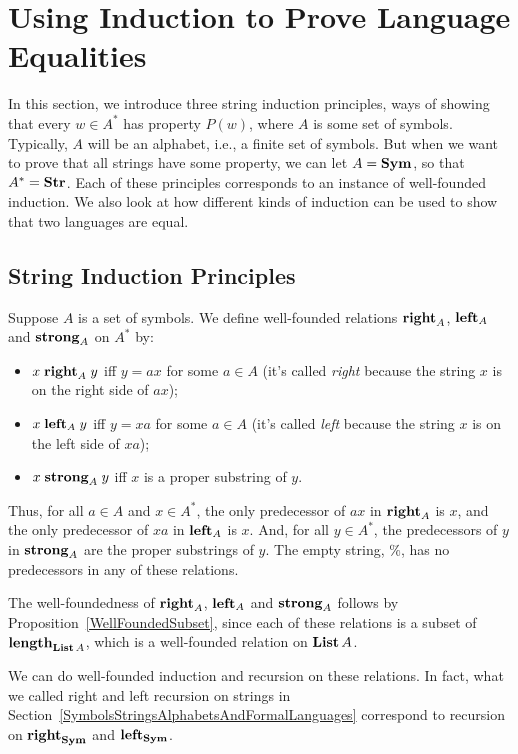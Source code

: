 \section{Using Induction to Prove Language Equalities}
\label{UsingInductionToProveLanguageEqualities}

In this section, we introduce three string induction principles, ways
of showing that every $w\in A^*$ has property $P(w)$, where $A$ is
some set of symbols.
Typically, $A$ will be an alphabet, i.e., a finite set of symbols.
But when we want to prove that all strings have some
property, we can let $A=\mathbf{Sym}$, so that $A^*=\mathbf{Str}$.
Each of these principles corresponds to an
instance of well-founded induction.  We also look at how different
kinds of induction can be used to show that two languages are equal.

\subsection{String Induction Principles}

Suppose $A$ is a set of symbols.  We define well-founded relations
$\mathrel{\mathbf{right}}_A$, $\mathrel{\mathbf{left}}_A$ and $\mathrel{\mathbf{strong}}_A$ on $A^*$ by:
\begin{itemize}
\item $x\mathrel{\mathbf{right}}_A y$ iff $y=ax$ for some $a\in A$
(it's called \emph{right} because the string $x$ is on the right
side of $ax$);
\item $x\mathrel{\mathbf{left}}_A y$ iff $y=xa$ for some $a\in A$
(it's called \emph{left} because the string $x$ is on the left
side of $xa$);
\item $x\mathrel{\mathbf{strong}}_A y$ iff $x$ is a proper substring of $y$.
\end{itemize}
Thus, for all $a\in A$ and $x\in A^*$, the only predecessor of $ax$ in
$\mathrel{\mathbf{right}}_A$ is $x$, and the only predecessor of $xa$ in
$\mathrel{\mathbf{left}}_A$ is $x$.  And, for all $y\in A^*$, the predecessors
of $y$ in $\mathrel{\mathbf{strong}}_A$ are the proper substrings of $y$.
The empty string, $\%$, has no predecessors in any of these
relations.

The well-foundedness of $\mathrel{\mathbf{right}}_A$, $\mathrel{\mathbf{left}}_A$ and $\mathrel{\mathbf{strong}}_A$
follows by Proposition~\ref{WellFoundedSubset}, since each of these
relations is a subset of $\mathrel{\mathbf{length}}_{\mathbf{List}\,A}$, which is a well-founded
relation on $\mathbf{List}\,A$.

We can do well-founded induction and recursion on these relations.
In fact, what we called right and left recursion on strings in
Section~\ref{SymbolsStringsAlphabetsAndFormalLanguages} correspond
to recursion on $\mathrel{\mathbf{right}}_{\mathbf{Sym}}$ and $\mathrel{\mathbf{left}}_{\mathbf{Sym}}$.

